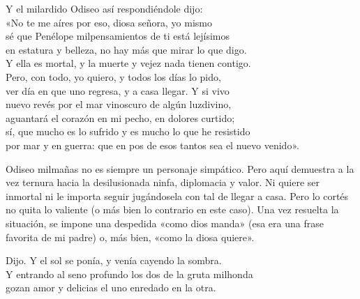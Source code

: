 \begin{versocita}
Y el milardido Odiseo así respondiéndole dijo:\\
«No te me aíres por eso, diosa señora, yo mismo\\
sé que Penélope milpensamientos de ti está lejísimos\\
en estatura y belleza, no hay más que mirar lo que digo.\\
Y ella es mortal, y la muerte y vejez nada tienen contigo.\\
Pero, con todo, yo quiero, y todos los días lo pido,\\
ver día en que uno regresa, y a casa llegar. Y si vivo\\
nuevo revés por el mar vinoscuro de algún luzdivino,\\
aguantará el corazón en mi pecho, en dolores curtido;\\
sí, que mucho es lo sufrido y es mucho lo que he resistido\\
por mar y en guerra: que en pos de esos tantos sea el nuevo venido».
\end{versocita}

Odiseo milmañas no es siempre un personaje simpático. Pero aquí demuestra a la vez ternura hacia la desilusionada ninfa, diplomacia y valor. Ni quiere ser inmortal ni le importa seguir jugándosela con tal de llegar a casa. Pero lo cortés no quita lo valiente (o más bien lo contrario en este caso). Una vez resuelta la situación, se impone una despedida «como dios manda» (esa era una frase favorita de mi padre) o, más bien, «como la diosa quiere».

\begin{versocita}
Dijo. Y el sol se ponía, y venía cayendo la sombra.\\
Y entrando al seno profundo los dos de la gruta milhonda\\
gozan amor y delicias el uno enredado en la otra.
\end{versocita}

